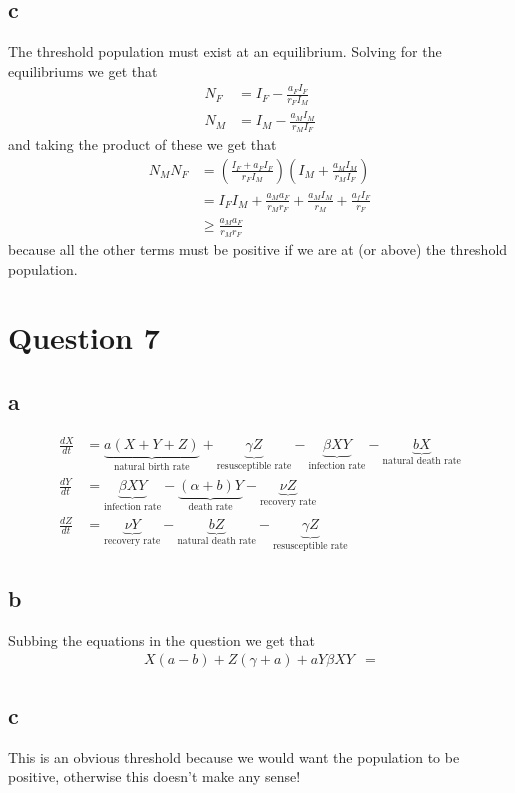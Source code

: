\documentclass{unswmaths}
\begin{document}
\subsection*{c}
The threshold population must exist at an equilibrium. Solving for the equilibriums we get that
\begin{align*}
    N_F &= I_F - \frac{a_FI_F}{r_FI_M} \\
    N_M &= I_M - \frac{a_MI_M}{r_MI_F}
\end{align*}
and taking the product of these we get that
\begin{align*}
    N_MN_F &= \left( \frac{I_F + a_FI_F}{r_FI_M} \right) \left( I_M + \frac{a_MI_M}{r_MI_F} \right) \\
        &= I_FI_M + \frac{a_Ma_F}{r_Mr_F} + \frac{a_MI_M}{r_M} + \frac{a_fI_F}{r_F} \\
        &\geq  \frac{a_Ma_F}{r_Mr_F} 
\end{align*}
because all the other terms must be positive if we are at (or above) the threshold population.
\section*{Question 7}
\subsection*{a}
\begin{align*}
    \frac{dX}{dt} &= \underbrace{a(X+Y+Z)}_{\text{natural birth rate}} + \underbrace{\gamma Z}_{\text{resusceptible rate}} - \underbrace{\beta XY}_{\text{infection rate}} - \underbrace{bX}_{\text{natural death rate}} \\
    \frac{dY}{dt} &= \underbrace{\beta XY}_{\text{infection rate}} - \underbrace{(\alpha + b)Y}_{\text{death rate}} - \underbrace{\nu Z}_{\text{recovery rate}} \\
    \frac{dZ}{dt} &= \underbrace{\nu Y}_{\text{recovery rate}} - \underbrace{bZ}_{\text{natural death rate}} - \underbrace{\gamma Z}_{\text{resusceptible rate}}
\end{align*}
\subsection*{b}
    Subbing the equations in the question we get that
    \begin{align*}
        X(a-b) + Z(\gamma + a) + aY \beta XY &= 
    \end{align*}
\subsection*{c}
This is an obvious threshold because we would want the population to be positive, otherwise this doesn't make any sense!
\end{document}
